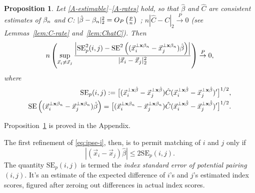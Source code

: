 \documentclass{article}
\newtheorem{prop}{Proposition}
\theoremstyle{remark}
\begin{document}
\begin{prop} \label{prop:PSdiffconsist}
Let \ref{A-estimable}--\ref{A-rates} hold,  so that $\hat\beta$ and $\hat{C}$ are consistent estimates of $\beta_{n }$ and $C$: $|\hat\beta - \beta_{n }|_{2}^{2} = O_{P}\left(\frac {p}{n}\right)$  \citep[Theorem~2.1 and Example~3]{he2000parameters}; $n|\hat{C} - C|_{2} \stackrel{P}{\rightarrow} 0$ (see Lemmas~\ref{lem:C-rate} and~\ref{lem:ChatC}).  Then  %
\begin{equation*}
n \left( \sup_{\vec{x}_{i} \neq \vec{x}_{j}} 
 \frac{ 
\left|\mathrm{SE}^{2}_{p}(i,j)
- \mathrm{SE}^{2}\left( (\vec{x}_i^{\perp \mathbf{x}\beta_{n }} - \vec{x}_j^{\perp \mathbf{x}\beta_{n }})\hat{\beta}\right)\right|}{|\vec{x}_{i} - \vec{x}_{j}|_{2}^{2}} \right)
\stackrel{P}{\rightarrow} 0, 
\end{equation*}
where 
\begin{align}
\mathrm{SE}_p(i,j) := \big[ (\vec{x}_{i}^{\perp \mathbf{x}\hat{\beta}} - \vec{x}_{j}^{\perp \mathbf{x}\hat{\beta}}) 
\hat{C}&
(\vec{x}_{i}^{{\perp \mathbf{x}\hat{\beta}}} - \vec{x}_{j}^{\perp \mathbf{x}\hat{\beta}})'\big]^{1/2}, \label{eq:12a}\\
\mathrm{SE}\left( (\vec{x}_i^{\perp \mathbf{x}\beta_{n }} - \vec{x}_j^{\perp \mathbf{x}\beta_{n }})\hat{\beta}\right) = \big[ (\vec{x}_{i}^{\perp \mathbf{x}\beta_{n }} - \vec{x}_{j}^{\perp \mathbf{x}\beta_{n }}) 
\hat{C}&
(\vec{x}_{i}^{{\perp \mathbf{x}\hat{\beta}}} - \vec{x}_{j}^{\perp \mathbf{x}\hat{\beta}})' \big]^{1/2}.\nonumber
\end{align}
\end{prop}
Proposition~\ref{prop:PSdiffconsist} is proved in the Appendix.

The first refinement of \eqref{eq:ipse-i}, then, is to permit matching of $i$ and $j$ only if  
\begin{equation}
|(\vec{x}_i - \vec{x}_j)\hat{\beta}|  \leq 2\mathrm{SE}_p(i,j) .
\label{eq:ipse-ii}
\end{equation}
The quantity $\mathrm{SE}_p(i,j) $ is termed the \emph{index standard error of potential pairing} $(i,j)$.  It's an estimate of the expected difference of $i$'s and $j$'s estimated index scores, figured after zeroing out differences in actual index scores.
\end{document}
